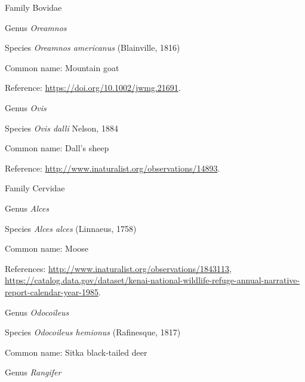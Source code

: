 \documentclass[9pt, article]{memoir}
\begin{document}
\begin{multicols}{2}
\vspace{6pt}\noindent\hspace{24pt}Family Bovidae


\vspace{6pt}\noindent\hspace{30pt}Genus \textit{Oreamnos}


\vspace{6pt}\noindent\hspace{36pt}Species \textit{Oreamnos americanus} (Blainville, 1816)


Common name: Mountain goat

Reference: 
\url{https://doi.org/10.1002/jwmg.21691}.

\vspace{6pt}\noindent\hspace{30pt}Genus \textit{Ovis}


\vspace{6pt}\noindent\hspace{36pt}Species \textit{Ovis dalli} Nelson, 1884


Common name: Dall's sheep

Reference: 
\url{http://www.inaturalist.org/observations/14893}.

\vspace{6pt}\noindent\hspace{24pt}Family Cervidae


\vspace{6pt}\noindent\hspace{30pt}Genus \textit{Alces}


\vspace{6pt}\noindent\hspace{36pt}Species \textit{Alces alces} (Linnaeus, 1758)


Common name: Moose

References: 
\url{http://www.inaturalist.org/observations/1843113}, 
\url{https://catalog.data.gov/dataset/kenai-national-wildlife-refuge-annual-narrative-report-calendar-year-1985}.

\vspace{6pt}\noindent\hspace{30pt}Genus \textit{Odocoileus}


\vspace{6pt}\noindent\hspace{36pt}Species \textit{Odocoileus hemionus} (Rafinesque, 1817)


Common name: Sitka black-tailed deer

\vspace{6pt}\noindent\hspace{30pt}Genus \textit{Rangifer}



\end{multicols}
\end{document}
